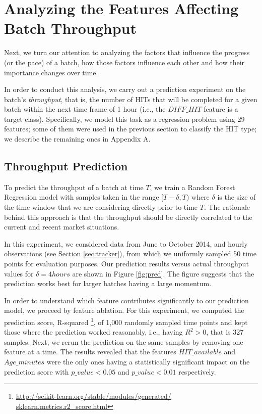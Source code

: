 \section{Analyzing the Features Affecting Batch Throughput}
\label{sec:throughput}
Next, we turn our attention to analyzing the factors that influence the progress (or the pace) of a batch, how those factors influence each other and how their importance changes over time. 

In order to conduct this analysis, we carry out a prediction experiment on the batch's \emph{throughput}, that is, the number of HITs that  will be completed for a given batch within the next time frame of 1 hour (i.e.,  the $DIFF\_HIT$ feature is a target class).
Specifically, we model this task as a regression problem using 29 features; some of them were used in the previous section to classify the HIT type; we describe the remaining ones in Appendix A.

\subsection{Throughput Prediction}

To predict the throughput of a batch at time $T$, we train a Random Forest Regression model with samples taken in the range $[T-\delta, T)$ where $\delta$ is the size of the time window that we are considering directly prior to time $T$. 
%
The rationale behind this approach is that the throughput should be directly correlated to the current and recent market situations. 

In this experiment, we considered  data from June to October 2014, and hourly observations (see Section \ref{sec:tracker}), from which we uniformly sampled 50 time points for evaluation purposes.
%
Our prediction results versus actual throughput values for $\delta=4hours$ are shown in Figure \ref{fig:pred}. 
%
The figure suggests that the prediction works best for larger batches having a large momentum.

In order to understand which feature contributes significantly to our prediction model, we proceed by feature ablation. For this experiment, we computed the prediction score, R-squared \footnote{\url{http://scikit-learn.org/stable/modules/generated/ sklearn.metrics.r2_score.html}}, of 1,000 randomly sampled time points and kept those where the prediction worked reasonably, i.e., having $R^2>0$, that is 327 samples. Next, we rerun the prediction on the same samples by removing one feature at a time. The results revealed that the features $HIT\_available$ and $Age\_minutes$ were the only ones having a statistically significant impact on the prediction score with $p\_value < 0.05$ and $p\_value < 0.01$ respectively. 

